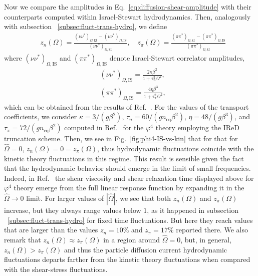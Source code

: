 \documentclass[aps,prd,preprint,nofootinbib,amsmath,amssymb,showpacs,longbibliography,singlecolumn,superscriptaddress,10pt]{revtex4-1}
\theoremstyle{plain}
\theoremstyle{definition}
\begin{document}
 
Now we compare the amplitudes in Eq.~\eqref{eq:diffusion-shear-amplitude} with their counterparts computed within Israel-Stewart hydrodynamics. Then, analogously with subsection ~\ref{subsec:fluct-trans-hydro}, we define
%
\begin{equation}
\label{eq:relat-corr-ampl}
\begin{aligned}
&
z_{n}(\Omega) = \frac{\left( \nu \nu^{*} \right)_{\Omega, \mathrm{kt}} - \left( \nu \nu^{*} \right)_{\Omega, \mathrm{IS}}}{\left( \nu \nu^{*} \right)_{\Omega, \mathrm{kt}}},
\quad
z_{\pi}(\Omega) = \frac{\left( \pi \pi^{*} \right)_{\Omega, \mathrm{kt}} - \left( \pi \pi^{*} \right)_{\Omega, \mathrm{IS}}}{\left( \pi \pi^{*} \right)_{\Omega, \mathrm{kt}}}
\end{aligned}    
\end{equation}
%
where $\left( \nu \nu^{*} \right)_{\Omega, \mathrm{IS}}$ and $\left( \pi \pi^{*} \right)_{\Omega, \mathrm{IS}}$ denote Israel-Stewart correlator amplitudes, 
%
\begin{equation}
\begin{aligned}
&
\left( \nu \nu^{*} \right)_{\Omega, \mathrm{IS}} 
=
\frac{2 \kappa \beta^{2}}{1 + \tau_{n}^{2} \Omega^{2}},
\\
&
\left( \pi \pi^{*} \right)_{\Omega, \mathrm{IS}} 
=
\frac{4 \eta \beta^{3}}{1 + \tau_{\pi}^{2} \Omega^{2}},
\end{aligned}    
\end{equation}
%
which can be obtained from the results of Ref.~\cite{Mullins:2023tjg}. For the values of the transport coefficients, we consider $\kappa = 3/(g \beta^{2})$, $\tau_{n} = 60/(g n_{\mathrm{eq}} \beta^{2})$, $\eta = 48/(g \beta^{3})$, and $\tau_{\pi} = 72/(g n_{\mathrm{eq}} \beta^{2})$ computed in Ref.~\cite{Rocha:2023hts} for the $\varphi^{4}$ theory employing the IReD truncation scheme. Then, we see in Fig.~\ref{fig:phi4-IS-vs-kin} that for that for $\widehat{\Omega} = 0$, $z_{n}(\Omega) = 0 = z_{\pi}(\Omega)$, thus hydrodynamic fluctuations coincide with the kinetic theory fluctuations in this regime. This result is sensible given the fact that the hydrodynamic behavior should emerge in the limit of small frequencies. Indeed, in Ref.~\cite{Rocha:2024cge} the shear viscosity and shear relaxation time displayed above for $\varphi^{4}$ theory emerge from the full linear response function by expanding it in the  $\widehat{\Omega} \to 0$ limit. For larger values of $|\widehat{\Omega}|$, we see that both $z_{n}(\Omega)$ and $z_{\pi}(\Omega)$ increase, but  they always range values below $1$, as it happened in subsection ~\ref{subsec:fluct-trans-hydro} for fixed time fluctuations. But here they reach values that are larger than the values $z_{n} = 10 \%$ and $z_{\pi} = 17 \%$ reported there. We also remark that $z_{n}(\Omega) \approx z_{\pi}(\Omega)$ in a region around $\widehat{\Omega} = 0$, but, in general, $z_{n}(\Omega) > z_{\pi}(\Omega)$ and thus the particle diffusion current hydrodynamic fluctuations departs farther from the kinetic theory fluctuations when compared with the shear-stress fluctuations. 
\end{document}
